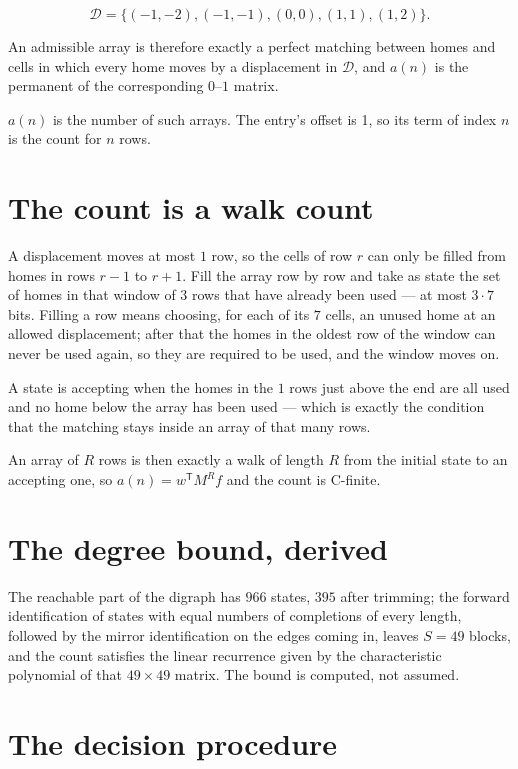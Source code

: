 \documentclass[11pt]{article}
\theoremstyle{definition}
\begin{document}
\[\mathcal{D} = \{(-1,-2), (-1,-1), (0,0), (1,1), (1,2)\}.\]

An admissible array is therefore exactly a perfect matching between homes and cells in which every home moves by a displacement in $\mathcal{D}$, and $a(n)$ is the permanent of the corresponding $0$--$1$ matrix.

$a(n)$ is the number of such arrays. The entry's offset is 1, so its term of index $n$ is the count for $n$ rows.

\section{The count is a walk count}

A displacement moves at most $1$ row, so the cells of row $r$ can only be filled from homes in rows $r-1$ to $r+1$. Fill the array row by row and take as state the set of homes in that window of $3$ rows that have already been used --- at most $3\cdot7$ bits. Filling a row means choosing, for each of its $7$ cells, an unused home at an allowed displacement; after that the homes in the oldest row of the window can never be used again, so they are required to be used, and the window moves on.

A state is accepting when the homes in the $1$ rows just above the end are all used and no home below the array has been used --- which is exactly the condition that the matching stays inside an array of that many rows.

An array of $R$ rows is then exactly a walk of length $R$ from the initial state to an accepting one, so $a(n) = w^{\mathsf T}M^{R}f$ and the count is C-finite.

\section{The degree bound, derived}

The reachable part of the digraph has $966$ states, $395$ after trimming; the forward identification of states with equal numbers of completions of every length, followed by the mirror identification on the edges coming in, leaves $S = 49$ blocks, and the count satisfies the linear recurrence given by the characteristic polynomial of that $49\times49$ matrix. The bound is computed, not assumed.

\section{The decision procedure}
\end{document}
